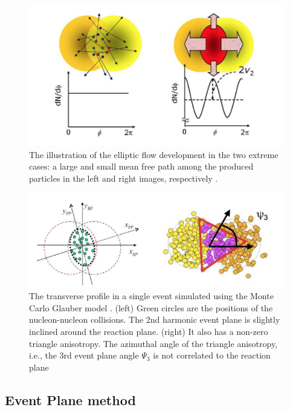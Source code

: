 \begin{figure}[h]
\centerline{\includegraphics[width=13.0cm]{figures/v2explin}}
\caption{The illustration of the elliptic flow development in the two extreme cases: a large and small mean free path among the produced particles in the left and right images, respectively \cite{Voloshin:2008dg}.}
\label{fig5}
\end{figure}

\begin{figure}[h]
\centerline{\includegraphics[width=13.0cm]{figures/fig_complxshape}}
\caption{The transverse profile in a single event simulated using the Monte Carlo Glauber model \cite{Miller:2007ri, Bzdak:2006qk}. (left) Green circles are the positions of the nucleon-nucleon collisions. The 2nd harmonic event plane is slightly inclined around the reaction plane. (right) It also has a non-zero triangle anisotropy. The azimuthal angle of the triangle anisotropy, i.e., the 3rd event plane angle $\Psi_3$ is not correlated to the reaction plane}
\label{fig:complexshape}
\end{figure}



\subsection{Event Plane method}

